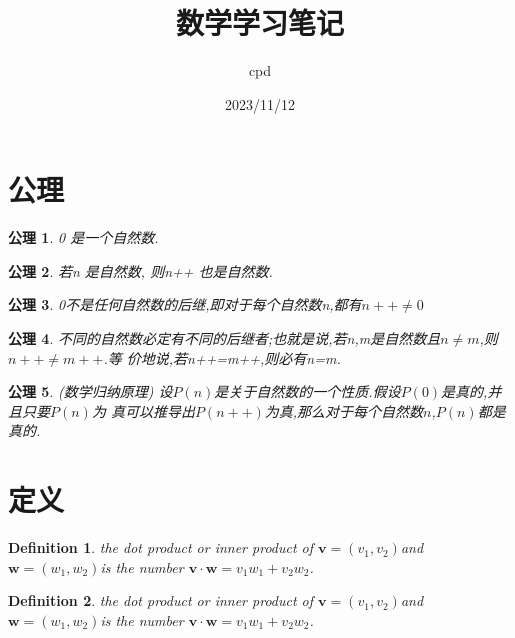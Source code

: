 \documentclass[UTF-8]{ctexart}
\newtheorem{definition}{Definition}[section]
\newtheorem{axiom}{公理}[section]
\begin{document}
\title {数学学习笔记} \author{cpd} \date{2023/11/12}
\maketitle

\tableofcontents
\newpage


\section{公理}
\begin{axiom}
0 是一个自然数.
\end{axiom}
\begin{axiom}
若n 是自然数, 则n++ 也是自然数.
\end{axiom}
\begin{axiom}
    0不是任何自然数的后继,即对于每个自然数n,都有$n++ \ne 0$
\end{axiom}
\begin{axiom}
不同的自然数必定有不同的后继者;也就是说,若n,m是自然数且$n \ne m$,则$n++\ne m++$.等
价地说,若n++=m++,则必有n=m.
\end{axiom}
\begin{axiom}
(数学归纳原理) 设$P(n)$是关于自然数的一个性质.假设$P(0)$是真的,并且只要$P(n)$为
真可以推导出$P(n++)$为真,那么对于每个自然数$n$,$P(n)$都是真的.
\end{axiom}
\section{定义}


\begin{definition}
  the dot product or inner product of $\mathbf{v}
=(v_1,v_2)$and$\mathbf{w}=(w_1,w_2)$is the number $\mathbf{v} \cdot \mathbf{w} = v_1w_1+v_2w_2$.

\end{definition}
\begin{definition}
  the dot product or inner product of $\mathbf{v}
=(v_1,v_2)$and$\mathbf{w}=(w_1,w_2)$is the number $\mathbf{v} \cdot \mathbf{w} = v_1w_1+v_2w_2$.

\end{definition}
\end{document}
